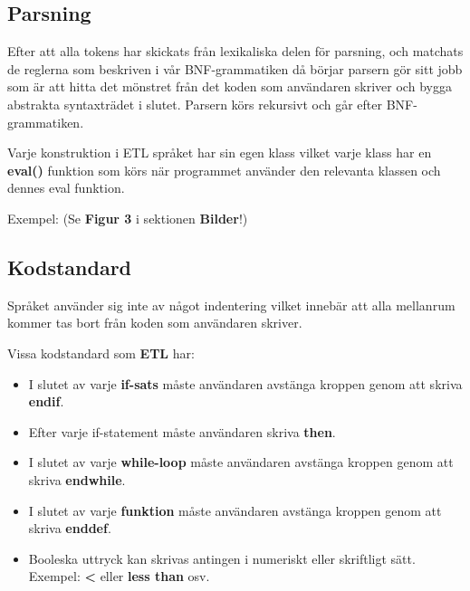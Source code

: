 \documentclass{TDP019mall}
\begin{document}
\subsection{Parsning}
Efter att alla tokens har skickats från lexikaliska delen för parsning, och matchats de reglerna som beskriven i vår 
BNF-grammatiken då börjar parsern gör sitt jobb som är att hitta det mönstret från det koden som användaren skriver och bygga abstrakta 
syntaxträdet i slutet. Parsern körs rekursivt och går efter BNF-grammatiken. 

Varje konstruktion i ETL språket har sin egen klass vilket varje klass har en \textbf{eval()} funktion som körs när programmet använder
 den relevanta klassen och dennes eval funktion. 
 
Exempel: (Se \textbf{Figur 3} i sektionen \textbf{Bilder}!)

\newpage
\subsection{Kodstandard}
Språket använder sig inte av något indentering vilket innebär att alla mellanrum kommer tas bort från koden som användaren skriver. 

Vissa kodstandard som \textbf{ETL} har:
\begin{itemize}
\item I slutet av varje \textbf{if-sats} måste användaren avstänga kroppen genom att skriva \textbf{endif}.
\item Efter varje if-statement måste användaren skriva \textbf{then}.
\item I slutet av varje \textbf{while-loop} måste användaren avstänga kroppen genom att skriva \textbf{endwhile}.
\item I slutet av varje \textbf{funktion} måste användaren avstänga kroppen genom att skriva \textbf{enddef}.
\item Booleska uttryck kan skrivas antingen i numeriskt eller skriftligt sätt. Exempel: \textbf{<} eller \textbf{less than} osv.
\end{itemize}
\end{document}

